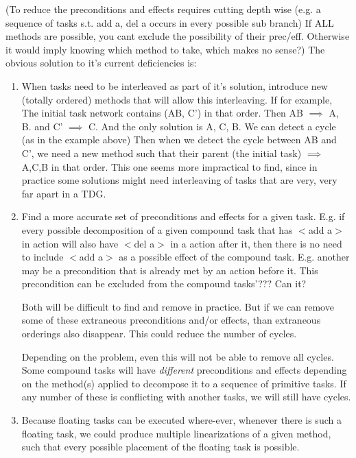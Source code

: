 (To reduce the preconditions and effects requires cutting depth wise (e.g. a sequence of tasks s.t.  add a, del a occurs in every possible sub branch)
If ALL methods are possible, you cant exclude the possibility of their prec/eff. Otherwise it would imply knowing which method to take, which makes no sense?)
The obvious solution to it's current deficiencies is: 
\begin{enumerate}
	\item When tasks need to be interleaved as part of it's solution, introduce new (totally ordered) methods that will allow this interleaving.
	If for example, The initial task network contains (AB, C') in that order. Then AB $\implies$ A, B.  and C' $\implies$ C.
	And the only solution is A, C, B. We can detect a cycle (as in the example above)
	Then when we detect the cycle between AB and C', we need a new method such that their parent (the initial task) $\implies$ A,C,B  in that order.  This one seems more impractical to find,	since in practice some solutions might need interleaving of tasks that are very, very far apart in a TDG.
	
	\item Find a more accurate set of preconditions and effects for a given task.  
	E.g. if every possible decomposition of a given compound task that has $<$add a$>$ in action will also have $<$del a$>$ in a action after it, 
	then there is no need to include $<$add a$>$ as a possible effect of the compound task.
	E.g. another may be a precondition that is already met by an action before it. This precondition can be excluded from the compound tasks'??? Can it?
	
	
	Both will be difficult to find and remove in practice. But if we can remove some of these extraneous preconditions and/or effects, than extraneous orderings also disappear. This could reduce the number
	of cycles.
	
	Depending on the problem, even this will not be able to remove all cycles.  Some compound tasks will have \emph{different} 
	preconditions and effects depending	on the method(s) applied to decompose it to a sequence of primitive tasks. If any number of
	these is conflicting with another tasks, we will still have cycles.
	
	\item Because floating tasks can be executed where-ever, whenever there is such a floating task, we could produce
	multiple linearizations of a given method, such that every possible placement of the floating task is possible.
\end{enumerate}